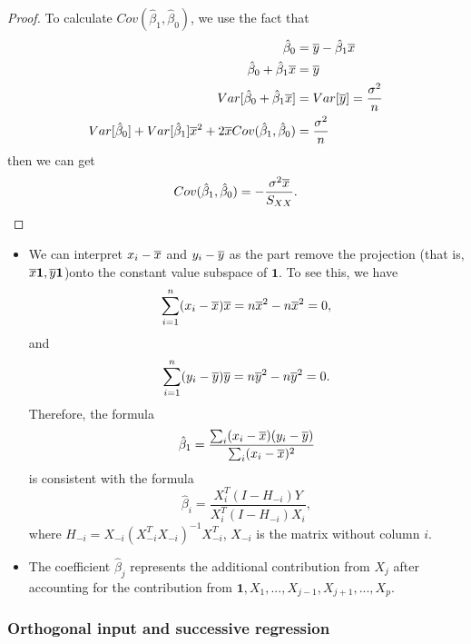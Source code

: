 \begin{refsection}
\begin{proof}
To calculate $Cov(\hat{\beta}_1,\hat{\beta}_0)$, we use the fact that
\begin{align*}
\hat{\beta}_0 &= \overline{y} - \hat{\beta}_1\overline{x} \\
\hat{\beta}_0 + \hat{\beta}_1\overline{x} &= \overline{y}  \\
Var[\hat{\beta}_0 + \hat{\beta}_1\overline{x}] &= Var[\overline{y}] = \frac{\sigma^2}{n} \\
Var[\hat{\beta}_0] + Var[\hat{\beta}_1]\overline{x}^2 + 2\overline{x}Cov(\hat{\beta}_1,\hat{\beta}_0) &= \frac{\sigma^2}{n} 
\end{align*}
then we can get 
$$Cov(\hat{\beta}_1,\hat{\beta}_0) = -\frac{\sigma^2\overline{x}}{S_{XX}}.$$
\end{proof}

\begin{remark}[interpretation]\hfill
\begin{itemize}
	\item We can interpret $x_i-\overline{x}$ and $y_i-\overline{y}$ as the part remove the projection (that is, $\overline{x}\bm{1}, \overline{y}\bm{1}$)onto the constant value subspace of $\bm{1}$. To see this, we have
	$$\sum_{i=1}^{n}(x_i - \overline{x})\overline{x} = n\overline{x}^2-n\overline{x}^2 = 0,$$
	and
		$$\sum_{i=1}^{n}(y_i - \overline{y})\overline{y} = n\overline{y}^2-n\overline{y}^2 = 0.$$
	Therefore, the formula 
	$$\hat{\beta}_1 = \frac{\sum_i (x_{i}-\overline{x})(y_i - \overline{y})}{\sum_i (x_{i}-\overline{x})^2}$$
	is consistent with the formula
	$$\hat{\beta}_i = \frac{X_i^T(I - H_{-i})Y}{X_i^T(I-H_{-i})X_i},$$
	where $H_{-i} = X_{-i}(X_{-i}^TX_{-i})^{-1} X_{-i}^T$, $X_{-i}$ is the matrix without column $i$.
	\item The coefficient $\hat{\beta}_j$ represents the additional contribution from $X_j$ after accounting for the contribution from $\bm{1},X_1,...,X_{j-1}, X_{j+1},...,X_p$.
\end{itemize}	

\end{remark}

\subsubsection{Orthogonal input and successive regression}



\end{refsection}

